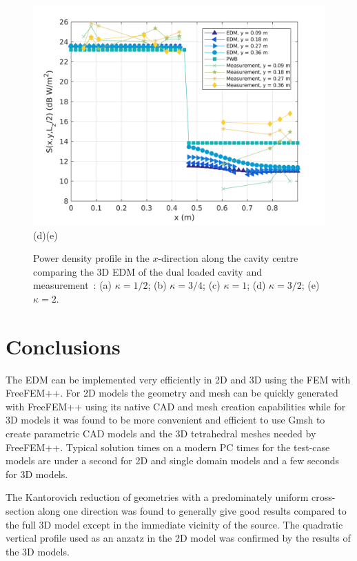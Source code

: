 \documentclass[a4paper]{article}
\numberwithin{equation}{section}
\begin{document}
\begin{figure}[hp]
\begin{center}
\includegraphics[width=0.49\linewidth]{figures/DDM-EEBC_3D_DL_PowerDensityProfileXMeas_JX_k2_0}\\
{\footnotesize (d)\hspace{75mm}(e)}\\
\vspace{-2mm}
\caption{\label{fg:measprofsdlk} Power density profile in the $x$-direction along the cavity centre comparing
the 3D EDM of the dual loaded cavity and measurement~\citep{Flintoft2017b}: (a) $\kappa=1/2$; (b) $\kappa=3/4$;
(c) $\kappa=1$; (d) $\kappa=3/2$; (e) $\kappa=2$.}
\end{center}
\end{figure}


\section[Conclusions]{Conclusions}
\label{sc:conc}

The EDM can be implemented very efficiently in 2D and 3D using the FEM with FreeFEM++. For 2D models the
geometry and mesh can be quickly generated with FreeFEM++ using its native CAD and mesh creation 
capabilities while for 3D models it was found to be more convenient and efficient to use Gmsh to
create parametric CAD models and the 3D tetrahedral meshes needed by FreeFEM++. Typical solution times
on a modern PC times for the test-case models are under a second for 2D and single domain models 
and a few seconds for 3D models. 

The Kantorovich reduction of geometries with a predominately uniform cross-section along one direction
was found to generally give good results compared to the full 3D model except in the immediate vicinity
of the source. The quadratic vertical profile used as an anzatz in the 2D model was confirmed by the
results of the 3D models.
\end{document}
